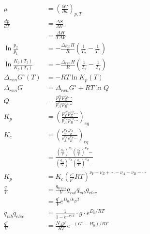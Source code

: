 \begin{align*}
\mu &= \left(\frac{\partial G}{\partial n}\right)_{p,T}\\
\frac{dp}{dT}&=\frac{\Delta S}{\Delta V}\\
&=\frac{\Delta H}{T\Delta V}\\
\ln{\frac{p_2}{p_1}}&=-\frac{\Delta_{vap}H}{R}\left(\frac{1}{T_2}-\frac{1}{T_1}\right)\\
\ln{\frac{K_p(T_2)}{K_p(T_1)}}&=-\frac{\Delta_{rxn}H}{R}\left(\frac{1}{T_2}-\frac{1}{T_1}\right)\\
\Delta _{rxn} G^{\circ}(T)&=-RT\ln{K_p(T)}\\
\Delta _{rxn} G&=\Delta _{rxn} G^{\circ} +RT\ln{Q}\\
Q&=\frac{p_Y^{\nu_Y}p_Z^{\nu_Z}\cdots}{p_A^{\nu_A}p_B^{\nu_B}\cdots}\\
K_p&=\left(\frac{p_Y^{\nu_Y}p_Z^{\nu_Z}\cdots}{p_A^{\nu_A}p_B^{\nu_B}\cdots}\right)_{eq}\\
K_c&=\left(\frac{c_Y^{\nu_Y}c_Z^{\nu_Z}\cdots}{c_A^{\nu_A}c_B^{\nu_B}\cdots}\right)_{eq}\\
&=\frac{\left(\frac{q_Y}{V}\right)^{\nu_Y}\left(\frac{q_Z}{V}\right)^{\nu_Z}\cdots}{\left(\frac{q_A}{V}\right)^{\nu_A}\left(\frac{q_A}{V}\right)^{\nu_A}\cdots}\\
K_p&=K_c\left(\frac{c^{\circ}}{p^{\circ}}RT\right)^{\nu_Y+\nu_Z+\cdots -\nu_A -\nu_B -\cdots}\\
\frac{q}{V}&=\frac{q_{trans}}{V}q_{rot}q_{vib}q_{elec}\\
&=\frac{q^{\circ}}{V}e^{D_0/k_BT}\\
q_{vib}q_{elec}&=\frac{1}{1-e^{-\theta/T}}\cdot g \cdot e^{D_0/RT}\\
\frac{q^{\circ}}{V}&=\frac{N_Ap^{\circ}}{RT}e^{-\left(G^{\circ}-H_0^{\circ}\right)/RT}\\
\end{align*}
